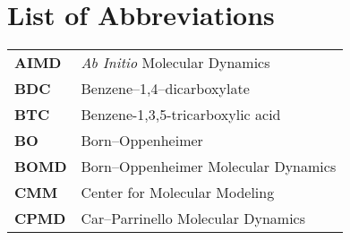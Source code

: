 \chapter{List of Abbreviations}

\vspace{-0.5cm}

\begin{longtable}{p{} p{}}
\hline
\textbf{AIMD} & \textit{Ab Initio} Molecular Dynamics \\
\textbf{BDC} & Benzene--1,4--dicarboxylate \\
\textbf{BTC} & Benzene-1,3,5-tricarboxylic acid \\
\textbf{BO} & Born--Oppenheimer \\
\textbf{BOMD} & Born--Oppenheimer Molecular Dynamics\\
\textbf{CMM} & Center for Molecular Modeling \\
\textbf{CPMD} & Car--Parrinello Molecular Dynamics\\

\end{longtable}
